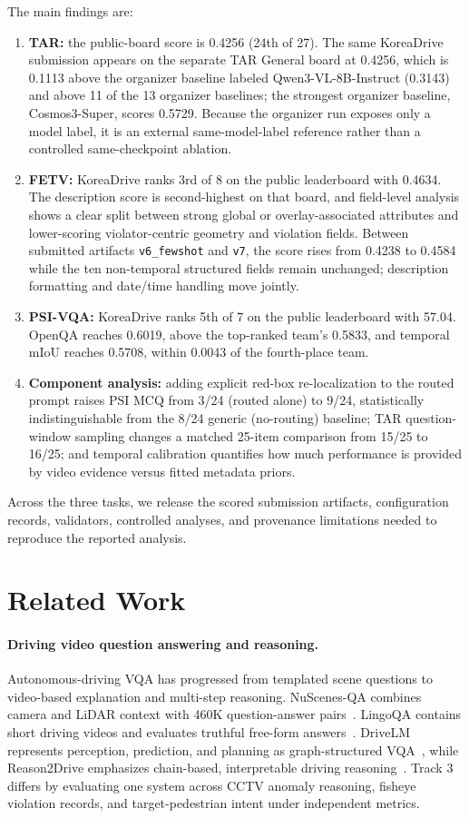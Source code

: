 \documentclass[runningheads]{llncs}
\begin{document}
The main findings are:
\begin{enumerate}[leftmargin=*,itemsep=2pt]
    \item \textbf{TAR:} the public-board score is 0.4256 (24th of 27). The same KoreaDrive submission appears on the separate TAR General board at 0.4256, which is 0.1113 above the organizer baseline labeled Qwen3-VL-8B-Instruct (0.3143) and above 11 of the 13 organizer baselines; the strongest organizer baseline, Cosmos3-Super, scores 0.5729. Because the organizer run exposes only a model label, it is an external same-model-label reference rather than a controlled same-checkpoint ablation.
    \item \textbf{FETV:} KoreaDrive ranks 3rd of 8 on the public leaderboard with 0.4634. The description score is second-highest on that board, and field-level analysis shows a clear split between strong global or overlay-associated attributes and lower-scoring violator-centric geometry and violation fields. Between submitted artifacts \texttt{v6\_fewshot} and \texttt{v7}, the score rises from 0.4238 to 0.4584 while the ten non-temporal structured fields remain unchanged; description formatting and date/time handling move jointly.
    \item \textbf{PSI-VQA:} KoreaDrive ranks 5th of 7 on the public leaderboard with 57.04. OpenQA reaches 0.6019, above the top-ranked team's 0.5833, and temporal mIoU reaches 0.5708, within 0.0043 of the fourth-place team.
    \item \textbf{Component analysis:} adding explicit red-box re-localization to the routed prompt raises PSI MCQ from 3/24 (routed alone) to 9/24, statistically indistinguishable from the 8/24 generic (no-routing) baseline; TAR question-window sampling changes a matched 25-item comparison from 15/25 to 16/25; and temporal calibration quantifies how much performance is provided by video evidence versus fitted metadata priors.
\end{enumerate}
Across the three tasks, we release the scored submission artifacts, configuration records, validators, controlled analyses, and provenance limitations needed to reproduce the reported analysis.

\section{Related Work}
\paragraph{Driving video question answering and reasoning.}
Autonomous-driving VQA has progressed from templated scene questions to video-based explanation and multi-step reasoning. NuScenes-QA combines camera and LiDAR context with 460K question-answer pairs~\cite{nuscenesqa}. LingoQA contains short driving videos and evaluates truthful free-form answers~\cite{lingoqa}. DriveLM represents perception, prediction, and planning as graph-structured VQA~\cite{drivelm}, while Reason2Drive emphasizes chain-based, interpretable driving reasoning~\cite{reason2drive}. Track 3 differs by evaluating one system across CCTV anomaly reasoning, fisheye violation records, and target-pedestrian intent under independent metrics.
\end{document}
